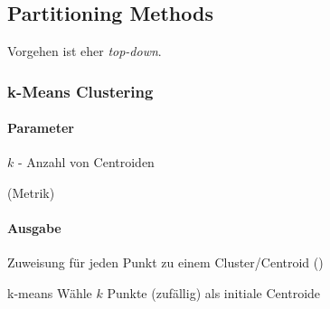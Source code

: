 \documentclass[10pt]{article} %
\begin{document}
 \subsection{Partitioning Methods}

Vorgehen ist eher \textit{top-down}.

\subsubsection{k-Means Clustering}
\label{k-means}

\paragraph{Parameter}
\begin{cptitemize} 
  	 \item $k$ - Anzahl von Centroiden  
  	 \item (Metrik)
 \end{cptitemize}  

\paragraph{Ausgabe}
\begin{cptitemize} 
	\item Zuweisung für jeden Punkt zu einem Cluster/Centroid ()
 \end{cptitemize}  

\begin{myalgo}{k-means}
   Wähle $k$ Punkte (zufällig) als initiale Centroide \;
\end{myalgo}


\begin{minipage}{0.5\columnwidth}
\end{minipage}
\begin{minipage}{0.49\columnwidth}
\end{minipage}
\end{document}
